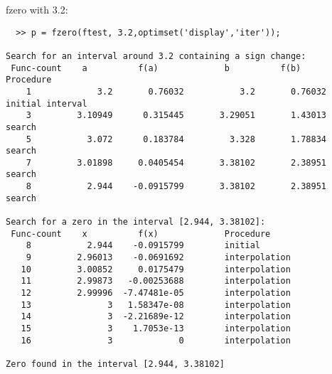 \documentclass{article}
\begin{document}
fzero with 3.2:
\begin{verbatim}
  >> p = fzero(ftest, 3.2,optimset('display','iter'));
 
Search for an interval around 3.2 containing a sign change:
 Func-count    a          f(a)             b          f(b)        Procedure
    1             3.2       0.76032           3.2       0.76032   initial interval
    3         3.10949      0.315445       3.29051       1.43013   search
    5           3.072      0.183784         3.328       1.78834   search
    7         3.01898     0.0405454       3.38102       2.38951   search
    8           2.944    -0.0915799       3.38102       2.38951   search
 
Search for a zero in the interval [2.944, 3.38102]:
 Func-count    x          f(x)             Procedure
    8           2.944    -0.0915799        initial
    9         2.96013    -0.0691692        interpolation
   10         3.00852     0.0175479        interpolation
   11         2.99873   -0.00253688        interpolation
   12         2.99996  -7.47481e-05        interpolation
   13               3   1.58347e-08        interpolation
   14               3  -2.21689e-12        interpolation
   15               3    1.7053e-13        interpolation
   16               3             0        interpolation
 
Zero found in the interval [2.944, 3.38102]
\end{verbatim}
\end{document}
